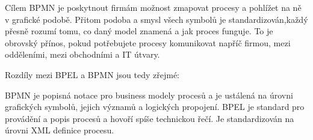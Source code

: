 \documentclass[]{article}
\begin{document}
Cílem BPMN je poskytnout firmám možnost zmapovat procesy a pohlížet na ně v grafické podobě. Přitom podoba a smysl všech symbolů je standardizován,každý přesně rozumí tomu, co daný model znamená a jak proces funguje. To je obrovský přínos, pokud potřebujete procesy komunikovat napříč firmou, mezi odděleními, mezi obchodními a IT útvary.


Rozdíly mezi BPEL a BPMN jsou tedy zřejmé:

BPMN je popisná notace pro business modely procesů a je ustálená na úrovni grafických symbolů, jejich významů a logických propojení.
BPEL je standard pro provádění a popis procesů a hovoří spíše technickou řečí. Je standardizován na úrovni XML definice procesu. \cite{BPELcz} %


\nocite{*}


\end{document}
